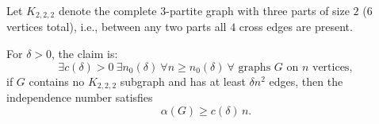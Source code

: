 Let $K_{2,2,2}$ denote the complete $3$-partite graph with three parts of size $2$ (6 vertices total), i.e., between any two parts all $4$ cross edges are present.

For $\delta>0$, the claim is:
\[
\exists c(\delta)>0\ \exists n_0(\delta)\ \forall n\ge n_0(\delta)\ \forall\text{ graphs }G\text{ on }n\text{ vertices},
\]
if $G$ contains no $K_{2,2,2}$ subgraph and has at least $\delta n^2$ edges, then the independence number satisfies
\[
\alpha(G)\ge c(\delta)\,n.
\]
